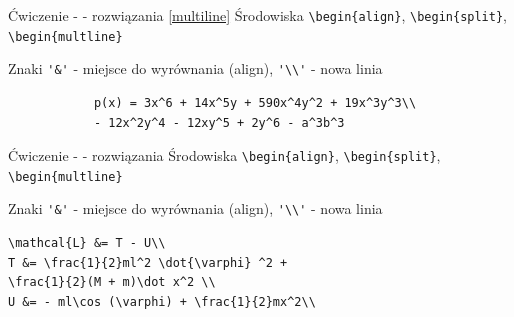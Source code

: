 \documentclass{beamer}
\theoremstyle{newblock}
\begin{document}
\begin{frame}[fragile]{Ćwiczenie -  - rozwiązania \eqref{multiline}}
    Środowiska \verb|\begin{align}|, \verb|\begin{split}|, \verb|\begin{multline}|
    
    Znaki \verb|'&'| - miejsce do wyrównania (align), \verb|'\\'| - nowa linia

    \begin{examples}
        \begin{verbatim}
            p(x) = 3x^6 + 14x^5y + 590x^4y^2 + 19x^3y^3\\ 
            - 12x^2y^4 - 12xy^5 + 2y^6 - a^3b^3
        \end{verbatim}
    \end{examples}
\end{frame}
\begin{frame}[fragile]{Ćwiczenie -  - rozwiązania}
    Środowiska \verb|\begin{align}|, \verb|\begin{split}|, \verb|\begin{multline}|
    
    Znaki \verb|'&'| - miejsce do wyrównania (align), \verb|'\\'| - nowa linia

    \begin{examples}
        \begin{verbatim}
\mathcal{L} &= T - U\\
T &= \frac{1}{2}ml^2 \dot{\varphi} ^2 + 
\frac{1}{2}(M + m)\dot x^2 \\
U &= - ml\cos (\varphi) + \frac{1}{2}mx^2\\
        \end{verbatim}
    \end{examples}
\end{frame}
\end{document}
